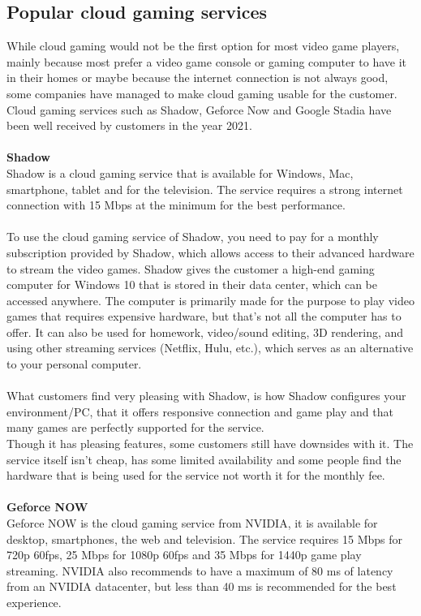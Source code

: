 \subsection{Popular cloud gaming services}
While cloud gaming would not be the first option for most video game players, mainly because most prefer a video game console or gaming computer to have it in their homes or maybe because the internet connection is not always good, some companies have managed to make cloud gaming usable for the customer. Cloud gaming services such as Shadow, Geforce Now and Google Stadia have been well received by customers in the year 2021.\\\\
\textbf{Shadow}\\
Shadow is a cloud gaming service that is available for Windows, Mac, smartphone, tablet and for the television. The service requires a strong internet connection with 15 Mbps at the minimum for the best performance.\\\\
To use the cloud gaming service of Shadow, you need to pay for a monthly subscription provided by Shadow, which allows access to their advanced hardware to stream the video games. Shadow gives the customer a high-end gaming computer for Windows 10 that is stored in their data center, which can be accessed anywhere. The computer is primarily made for the purpose to play video games that requires expensive hardware, but that's not all the computer has to offer. It can also be used for homework, video/sound editing, 3D rendering, and using other streaming services (Netflix, Hulu, etc.), which serves as an alternative to your personal computer.\\\\
What customers find very pleasing with Shadow, is how Shadow configures your environment/PC, that it offers responsive connection and game play and that many games are perfectly supported for the service.\\Though it has pleasing features, some customers still have downsides with it. The service itself isn't cheap, has some limited availability and some people find the hardware that is being used for the service not worth it for the monthly fee.\\\\
\textbf{Geforce NOW}\\
Geforce NOW is the cloud gaming service from NVIDIA, it is available for desktop, smartphones, the web and television. The service requires 15 Mbps for 720p 60fps, 25 Mbps for 1080p 60fps and 35 Mbps for 1440p game play streaming. NVIDIA also recommends to have a maximum of 80 ms of latency from an NVIDIA datacenter, but less than 40 ms is recommended for the best experience.\\\\
